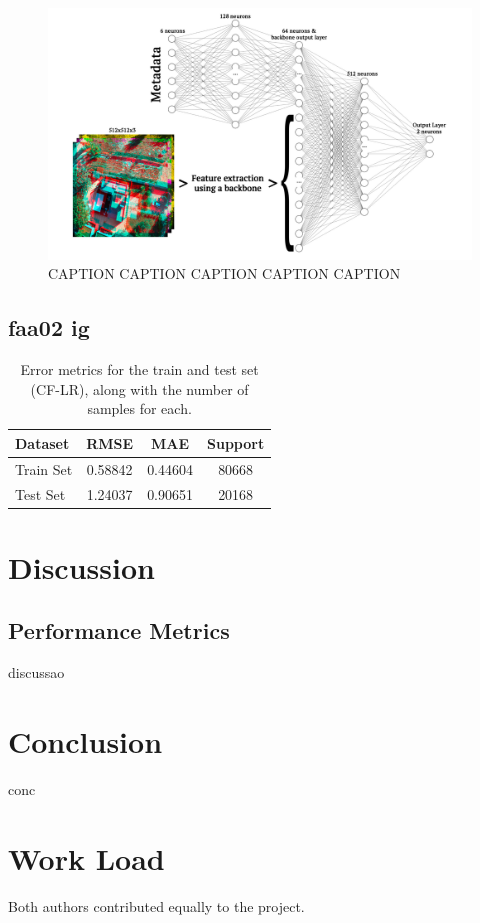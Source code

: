 \documentclass[conference]{IEEEtran}
\begin{document}
\begin{figure}[H]
    \centering
    \includegraphics[width=1\linewidth]{assets/nn.png}
    \caption{CAPTION CAPTION CAPTION CAPTION CAPTION}
    \label{fig:nn}
\end{figure}

\subsection{faa02 ig}



\begin{table}[H]
\centering
\caption{Error metrics for the train and test set (CF-LR), along with the number of samples for each.}
\label{tab:model01_results}
\begin{tabular}{lccc}
\toprule
\textbf{Dataset} & \textbf{RMSE} & \textbf{MAE} & \textbf{Support} \\
\midrule
Train Set & 0.58842 & 0.44604 & 80668 \\
Test Set & 1.24037 & 0.90651 & 20168 \\
\bottomrule
\end{tabular}
\end{table}

\section{Discussion} 

\subsection{Performance Metrics}

discussao


\section{Conclusion}

conc


\section*{Work Load}

Both authors contributed equally to the project.



\end{document}
